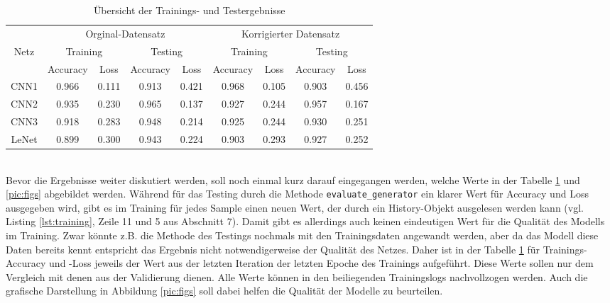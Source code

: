 \begin{table} [ht]
	\begin{tabular}{|c|cc|cc||cc|cc|}
		\hline 
		& \multicolumn{4}{|c||}{Orginal-Datensatz} & \multicolumn{4}{|c|}{Korrigierter Datensatz} \\ 
		Netz & \multicolumn{2}{|c|}{Training} & \multicolumn{2}{|c||}{Testing} & \multicolumn{2}{|c|}{Training} & \multicolumn{2}{|c|}{Testing} \\
		& Accuracy & Loss & Accuracy & Loss & Accuracy & Loss & Accuracy & Loss \\ \hline 
		CNN1 & 0.966 & 0.111 & 0.913 & 0.421 & 0.968 & 0.105 & 0.903 & 0.456 \\
		CNN2 & 0.935 & 0.230 & 0.965 & 0.137 & 0.927 & 0.244 & 0.957 & 0.167 \\
		CNN3 & 0.918 & 0.283 & 0.948 & 0.214 & 0.925 & 0.244 & 0.930 & 0.251 \\
		LeNet& 0.899 & 0.300 & 0.943 & 0.224 & 0.903 & 0.293 & 0.927 & 0.252 \\ \hline
		
	\end{tabular}
	\caption{Übersicht der Trainings- und Testergebnisse} \label{tab:ergebnisse}
\end{table} \ \\
%
Bevor die Ergebnisse weiter diskutiert werden, soll noch einmal kurz darauf eingegangen werden, welche Werte in der Tabelle \ref{tab:ergebnisse} und \ref{pic:figs} abgebildet werden.
Während für das Testing durch die Methode \texttt{evaluate\_generator} ein klarer Wert für Accuracy und Loss ausgegeben wird, gibt es im Training für jedes Sample einen neuen Wert, der durch ein History-Objekt ausgelesen werden kann (vgl. Listing \ref{lst:training}, Zeile 11 und 5 aus Abschnitt 7). Damit gibt es allerdings auch keinen eindeutigen Wert für die Qualität des Modells im Training. Zwar könnte z.B. die Methode des Testings nochmals mit den Trainingsdaten angewandt werden, aber da das Modell diese Daten bereits kennt entspricht das Ergebnis nicht notwendigerweise der Qualität des Netzes. Daher ist in der Tabelle \ref{tab:ergebnisse} für Trainings-Accuracy und -Loss jeweils der Wert aus der letzten Iteration der letzten Epoche des Trainings aufgeführt. Diese Werte sollen nur dem Vergleich mit denen aus der Validierung dienen. Alle Werte können in den beiliegenden Trainingslogs nachvollzogen werden. Auch die grafische Darstellung in Abbildung \ref{pic:figs} soll dabei helfen die Qualität der Modelle zu beurteilen.\\
\\

